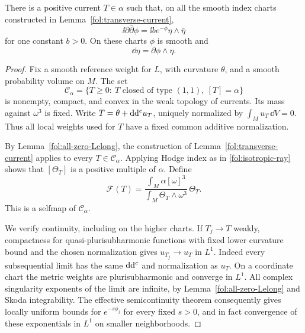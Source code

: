 \begin{lemma}\label{fol:fixed-point}
There is a positive current $T\in\alpha$ such that, on all the smooth
index charts constructed in Lemma~\ref{fol:transverse-current},
\begin{equation}\label{fol:fixed-point-equation}
 \ii\partial\bar\partial\phi
 =\ii b e^{-\phi}\eta\wedge\bar\eta
\end{equation}
for one constant $b>0$.  On these charts $\phi$ is smooth and
\begin{equation}\label{fol:eta-derivative}
 \dd\eta=\partial\phi\wedge\eta.
\end{equation}
\end{lemma}

\begin{proof}
Fix a smooth reference weight for $L$, with curvature $\theta$, and a
smooth probability volume on $M$.  The set
\[
 \mathcal C_\alpha=
 \{T\geq0:\ T\text{ closed of type }(1,1),\ [T]=\alpha\}
\]
is nonempty, compact, and convex in the weak topology of currents.
Its mass against $\omega^3$ is fixed.  Write
$T=\theta+\mathrm{d}\mathrm{d}^{c} u_T$, uniquely normalized by
$\int_Mu_T\,\dd V=0$.  Thus all local weights used for $T$ have
a fixed common additive normalization.

By Lemma~\ref{fol:all-zero-Lelong}, the construction of
Lemma~\ref{fol:transverse-current} applies to every $T\in\mathcal C_\alpha$.
Applying Hodge index as in \eqref{fol:isotropic-ray} shows that
$[\Theta_T]$ is a positive multiple of $\alpha$.  Define
\begin{equation}\label{fol:fixed-point-map}
 \mathcal F(T)=
 \frac{\int_M\alpha[\omega]^3}{\int_M\Theta_T\wedge\omega^3}\,\Theta_T.
\end{equation}
This is a selfmap of $\mathcal C_\alpha$.

We verify continuity, including on the higher charts.  If $T_j\to T$
weakly, compactness for quasi-plurisubharmonic functions with fixed lower
curvature bound and the chosen normalization gives
$u_{T_j}\to u_T$ in $L^1$.  Indeed every subsequential limit has the same
$\mathrm{d}\mathrm{d}^{c}$ and normalization as $u_T$.  On a coordinate chart the metric
weights are plurisubharmonic and converge in $L^1$.
All complex singularity exponents of the limit are infinite, by
Lemma~\ref{fol:all-zero-Lelong} and Skoda integrability.
The effective semicontinuity theorem
\cite[Theorem~0.2(2)]{DemaillyKollar} consequently gives locally uniform
bounds for $e^{-s\phi_j}$ for every fixed $s>0$, and in fact convergence
of these exponentials in $L^1$ on smaller neighborhoods.


\end{proof}
